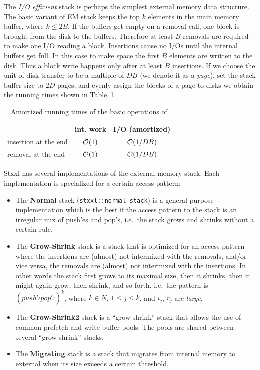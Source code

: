 \documentclass[twoside]{book}
\newcommand{\stxxl}{{\sc Stxxl} }
\begin{document}
The \emph{I/O efficient} stack is perhaps the simplest external memory
data structure. The basic variant of EM stack keeps the top $k$
elements in the main memory buffer, where $k \leq 2B$. If the buffers
get empty on a removal call, one block is brought from the disk to the
buffers. Therefore at least $B$ removals are required to make one I/O
reading a block. Insertions cause no I/Os until the internal buffers
get full. In this case to make space the first $B$ elements are
written to the disk. Thus a block write happens only after at least
$B$ insertions. If we choose the unit of disk
transfer to be a multiple of $DB$ (we denote it as a \emph{page}), set the
stack buffer size to $2D$ pages, and evenly assign the blocks of a
page to disks we obtain the running times shown in
Table~\ref{rtstack}. 

\begin{table}[h]
\begin{center}
\caption{Amortized running times of the basic operations of \xstack}
\label{rtstack}
\begin{tabular}{|l|c|c|}
\hline
                    & int. work & I/O (amortized)\\
\hline\hline
insertion at the end& $\mathcal{O}\!\left( 1\right)$ & $\mathcal{O}\!\left( 1/DB\right)$\\
\hline
removal at the end  & $\mathcal{O}\!\left( 1\right)$ & $\mathcal{O}\!\left( 1/DB\right)$ \\
\hline
\end{tabular}
\end{center}
\end{table}

\stxxl has several implementations of the external memory stack. Each 
implementation is specialized for a certain access pattern:
\begin{itemize}
\item The {\bf Normal } stack (\texttt{stxxl::normal\_stack}) is a general
purpose implementation which is the best if the access pattern
to the stack is an irregular mix of push'es and pop's, i.e.\ the stack
grows and shrinks without a certain rule.
\item The {\bf Grow-Shrink} stack is a stack that is optimized for an
access pattern where the insertions are (almost) not intermixed with
the removals, and/or vice versa, the removals are (almost) not
intermixed with the insertions. In other words the stack first grows
to its maximal size, then it shrinks, then it might again grow, then
shrink, and so forth, i.e.\ the pattern is
$(push^{i_j}pop^{r_j})^k$, where $k \in N$, $1\leq j\leq k$, and
$i_j$, $r_j$ are \emph{large}. 
\item The {\bf Grow-Shrink2} stack is a ``grow-shrink'' stack that
allows the use of common prefetch and write buffer pools. The pools
are shared between several ``grow-shrink'' stacks.
\item The {\bf Migrating} stack is a stack that migrates from
internal memory to external when its size exceeds a certain
threshold. 
\end{itemize}
\end{document}
